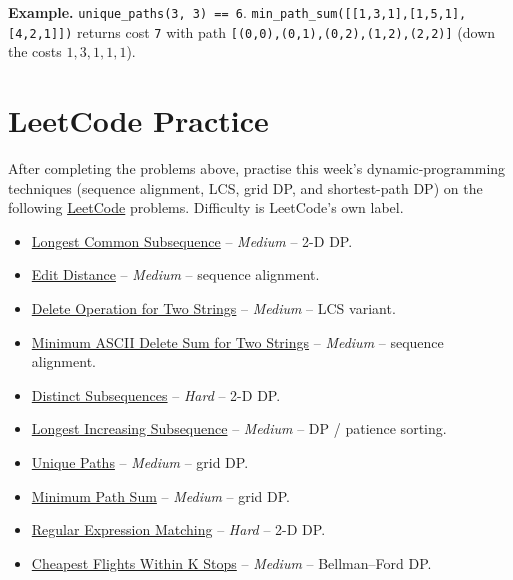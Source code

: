 \documentclass[11pt]{article}
\begin{document}
\textbf{Example.} \texttt{unique\_paths(3, 3) == 6}.
\texttt{min\_path\_sum([[1,3,1],[1,5,1],[4,2,1]])} returns cost \texttt{7} with path
\texttt{[(0,0),(0,1),(0,2),(1,2),(2,2)]} (down the costs $1,3,1,1,1$).

\newpage
\section{LeetCode Practice}

After completing the problems above, practise this week's dynamic-programming techniques
(sequence alignment, LCS, grid DP, and shortest-path DP) on the following
\href{https://leetcode.com}{LeetCode} problems. Difficulty is LeetCode's own label.

\begin{itemize}
  \item \href{https://leetcode.com/problems/longest-common-subsequence/}{Longest Common Subsequence} -- \emph{Medium} -- 2-D DP.
  \item \href{https://leetcode.com/problems/edit-distance/}{Edit Distance} -- \emph{Medium} -- sequence alignment.
  \item \href{https://leetcode.com/problems/delete-operation-for-two-strings/}{Delete Operation for Two Strings} -- \emph{Medium} -- LCS variant.
  \item \href{https://leetcode.com/problems/minimum-ascii-delete-sum-for-two-strings/}{Minimum ASCII Delete Sum for Two Strings} -- \emph{Medium} -- sequence alignment.
  \item \href{https://leetcode.com/problems/distinct-subsequences/}{Distinct Subsequences} -- \emph{Hard} -- 2-D DP.
  \item \href{https://leetcode.com/problems/longest-increasing-subsequence/}{Longest Increasing Subsequence} -- \emph{Medium} -- DP / patience sorting.
  \item \href{https://leetcode.com/problems/unique-paths/}{Unique Paths} -- \emph{Medium} -- grid DP.
  \item \href{https://leetcode.com/problems/minimum-path-sum/}{Minimum Path Sum} -- \emph{Medium} -- grid DP.
  \item \href{https://leetcode.com/problems/regular-expression-matching/}{Regular Expression Matching} -- \emph{Hard} -- 2-D DP.
  \item \href{https://leetcode.com/problems/cheapest-flights-within-k-stops/}{Cheapest Flights Within K Stops} -- \emph{Medium} -- Bellman--Ford DP.
\end{itemize}
\end{document}
